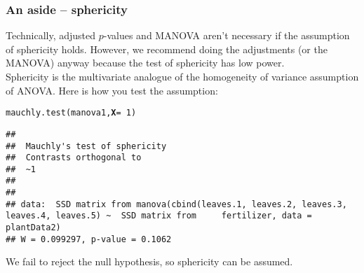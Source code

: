 \documentclass[color=usenames,dvipsnames]{beamer}\usepackage[]{graphicx}\usepackage[]{color}
\makeatletter
\newcommand{\hlnum}[1]{\textcolor[rgb]{0.69,0.494,0}{#1}}%
\newcommand{\hlopt}[1]{\textcolor[rgb]{0,0,0}{#1}}%
\newcommand{\hlstd}[1]{\textcolor[rgb]{0,0,0}{#1}}%
\newcommand{\hlkwc}[1]{\textcolor[rgb]{0,0,0}{\textbf{#1}}}%
\newcommand{\hlkwd}[1]{\textcolor[rgb]{0.004,0.004,0.506}{#1}}%
\newenvironment{kframe}{%
 \def\at@end@of@kframe{}%
 \ifinner\ifhmode%
  \def\at@end@of@kframe{\end{minipage}}%
  \begin{minipage}{\columnwidth}%
 \fi\fi%
 \def\FrameCommand##1{\hskip\@totalleftmargin \hskip-\fboxsep
 \colorbox{shadecolor}{##1}\hskip-\fboxsep
     \hskip-\linewidth \hskip-\@totalleftmargin \hskip\columnwidth}%
 \MakeFramed {\advance\hsize-\width
   \@totalleftmargin\z@ \linewidth\hsize
   \@setminipage}}%
 {\par\unskip\endMakeFramed%
 \at@end@of@kframe}
\newenvironment{knitrout}{}{} %
\makeatother
\begin{document}
\begin{frame}[fragile]
  \frametitle{An aside -- sphericity}
  \small
  {Technically, adjusted $p$-values and MANOVA aren't necessary if the
    assumption of sphericity holds. \alert{However}, we recommend
    doing the adjustments (or the MANOVA) anyway because the test of
    sphericity has low power. \\}
  \pause
  \vfill
  Sphericity is the multivariate analogue of the homogeneity of variance assumption of ANOVA.
  \pause
  \vfill
  Here is how you test the assumption:
  \footnotesize
\begin{knitrout}\footnotesize
{}\color{fgcolor}\begin{kframe}
\begin{alltt}
\hlkwd{mauchly.test}\hlstd{(manova1,} \hlkwc{X}\hlstd{=}\hlopt{~}\hlnum{1}\hlstd{)}
\end{alltt}
\begin{verbatim}
## 
## 	Mauchly's test of sphericity
## 	Contrasts orthogonal to
## 	~1
## 
## 
## data:  SSD matrix from manova(cbind(leaves.1, leaves.2, leaves.3, leaves.4, leaves.5) ~  SSD matrix from     fertilizer, data = plantData2)
## W = 0.099297, p-value = 0.1062
\end{verbatim}
\end{kframe}
\end{knitrout}
\pause
\vfill
\small %
{\centering We fail to reject the null hypothesis, so sphericity
  can be assumed. \\}
\end{frame}
\end{document}
